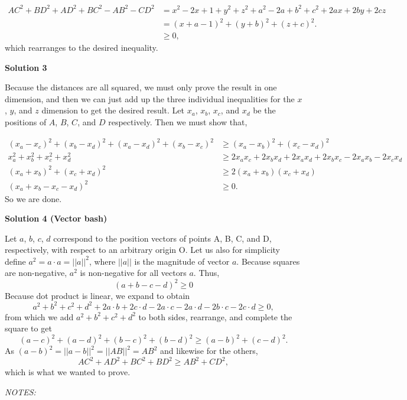 \begin{enumerate}
 
 \begin{align*} AC^2 + BD^2 + AD^2 + BC^2 - AB^2 - CD^2 &= x^2-2x+1+y^2+z^2+a^2-2a+b^2+c^2+2ax+2by+2cz \\ &= (x+a-1)^2 + (y+b)^2 + (z+c)^2. \\ &\geq 0, \end{align*}
which rearranges to the desired inequality.

 



\textbf{Solution 3}

Because the distances are all squared, we must only prove the result in one dimension, and then we can just add up the three individual inequalities for the $x$, $y$, and $z$ dimension to get the desired result. Let $x_a$, $x_b$, $x_c$, and $x_d$ be the positions of $A$, $B$, $C$, and $D$ respectively. Then we must show that,

 
 \begin{align*} (x_a - x_c)^2 + (x_b-x_d)^2 + (x_a - x_d)^2 + (x_b - x_c)^2 &\geq (x_a - x_b)^2 + (x_c-x_d)^2 \\ x_a^2 + x_b^2 + x_c^2 + x_d^2 &\geq 2x_a x_c + 2x_b x_d + 2x_a x_d + 2x_b x_c - 2x_a x_b - 2x_c x_d \\ (x_a + x_b)^2 + (x_c + x_d)^2 &\geq 2(x_a +x_b)(x_c + x_d)\\ (x_a + x_b - x_c - x_d)^2 &\geq 0. \end{align*}
So we are done.

 



\textbf{Solution 4 (Vector bash)}

Let $a$, $b$, $c$, $d$ correspond to the position vectors of points A, B, C, and D, respectively, with respect to an arbitrary origin O. Let us also for simplicity define $a^2 = a \cdot a = ||a||^2$, where $||a||$ is the magnitude of vector $a$. Because squares are non-negative, $a^2$ is non-negative for all vectors $a$. Thus,
 \[(a + b - c - d)^2 \ge 0\]Because dot product is linear, we expand to obtain
 \[a^2 + b^2 + c^2 + d^2 + 2a \cdot b + 2 c \cdot d - 2 a \cdot c - 2 a \cdot d - 2 b \cdot c - 2 c \cdot d \ge 0,\]from which we add $a^2 + b^2 + c^2 + d^2$ to both sides, rearrange, and complete the square to get
 \[(a-c)^2 + (a-d)^2 + (b-c)^2 + (b-d)^2 \ge (a-b)^2 + (c-d)^2.\]As $(a-b)^2 = ||a-b||^2 = ||AB||^2 = AB^2$ and likewise for the others,
 \[AC^2 + AD^2 + BC^2 + BD^2 \ge AB^2 + CD^2,\]which is what we wanted to prove.

 \textit{NOTES:}


\end{enumerate}
